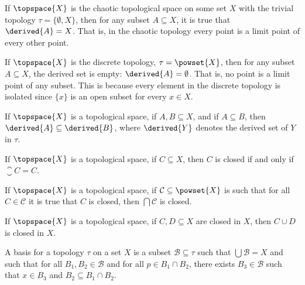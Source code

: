 \documentclass{article}                                                        %
\begin{document}
        \begin{example}
            If $\topspace{X}$ is the chaotic topological space on some set $X$
            with the trivial topology $\tau=\{\emptyset,X\}$, then for any
            subset $A\subseteq{X}$, it is true that $\derived{A}=X$. That is,
            in the chaotic topology every point is a limit point of every other
            point.
        \end{example}
        \begin{example}
            If $\topspace{X}$ is the discrete topology, $\tau=\powset{X}$, then
            for any subset $A\subseteq{X}$, the derived set is empty:
            $\derived{A}=\emptyset$. That is, no point is a limit point of any
            subset. This is because every element in the discrete topology is
            isolated since $\{x\}$ is an open subset for every $x\in{X}$.
        \end{example}
        \begin{theorem}
            If $\topspace{X}$ is a topological space, if $A,B\subseteq{X}$, and
            if $A\subseteq{B}$, then $\derived{A}\subseteq\derived{B}$, where
            $\derived{Y}$ denotes the derived set of $Y$ in $\tau$.
        \end{theorem}
        \begin{theorem}
            If $\topspace{X}$ is a topological space, if $C\subseteq{X}$, then
            $C$ is closed if and only if $\closure{C}=C$.
        \end{theorem}
        \begin{theorem}
            If $\topspace{X}$ is a topological space, if
            $\mathcal{C}\subseteq\powset{X}$ is such that for all
            $C\in\mathcal{C}$ it is true that $C$ is closed, then
            $\bigcap\mathcal{C}$ is closed.
        \end{theorem}
        \begin{theorem}
            If $\topspace{X}$ is a topological space, if $C,D\subseteq{X}$ are
            closed in $X$, then $C\cup{D}$ is closed in $X$.
        \end{theorem}
        \begin{definition}
            A basis for a topology $\tau$ on a set $X$ is a subset
            $\mathcal{B}\subseteq\tau$ such that $\bigcup\mathcal{B}=X$ and such
            that for all $B_{1},B_{2}\in\mathcal{B}$ and for all
            $p\in{B}_{1}\cap{B}_{2}$, there exists $B_{3}\in\mathcal{B}$ such
            that $x\in{B}_{3}$ and $B_{2}\subseteq{B}_{1}\cap{B}_{2}$.
        \end{definition}
\end{document}
